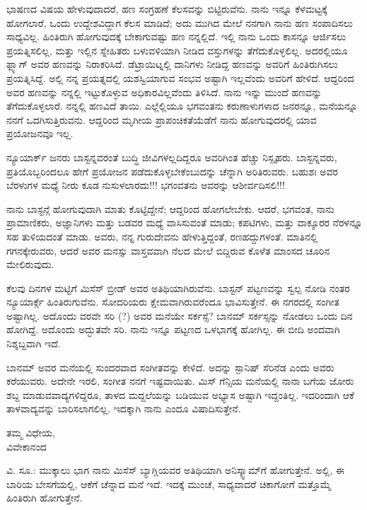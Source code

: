 ಭಾಷಣದ ವಿಷಯ ಹೇಳುವುದಾದರೆ, ಹಣ ಸಂಗ್ರಹಣೆ ಕೆಲಸವನ್ನು ಬಿಟ್ಟಿರುವೆನು. ನಾನು ಇನ್ನೂ ಕೆಳಮಟ್ಟಕ್ಕೆ ಹೋಗಲಾರೆ, ಒಂದು ಉದ್ದೇಶವಿದ್ದಾಗ ಕೆಲಸ ಮಾಡಿದೆ; ಅದು ಮುಗಿದ ಮೇಲೆ ನನಗಾಗಿ ನಾನು ಹಣ ಸಂಪಾದಿಸಲು ಸಾಧ್ಯವಿಲ್ಲ. ಹಿಂತಿರುಗಿ ಹೋಗುವುದಕ್ಕೆ ಬೇಕಾಗುವಷ್ಟು ಹಣ ನನ್ನಲ್ಲಿದೆ. ಇಲ್ಲಿ ನಾನು ಒಂದು ಕಾಸನ್ನೂ ಆರ್ಜಿಸಲು ಪ್ರಯತ್ನಿಸಲಿಲ್ಲ, ಮತ್ತು ಇಲ್ಲಿನ ಸ್ನೇಹಿತರು ಬಳುವಳಿಯಾಗಿ ನೀಡಿದ ವಸ್ತುಗಳನ್ನು ತೆಗೆದುಕೊಳ್ಳಲಿಲ್ಲ. ಅದರಲ್ಲಿಯೂ ಫ್ಲ್ಯಾಗ್ ಅವರ ಹಣವನ್ನು ನಿರಾಕರಿಸಿದೆ. ಡೆಟ್ರಾಯಿಟ್ನಲ್ಲಿ ದಾನಿಗಳು ನೀಡಿದ್ದ ಹಣವನ್ನು ಅವರಿಗೆ ಹಿಂತಿರುಗಿಸಲು ಪ್ರಯತ್ನಿಸಿದ್ದೆ. ಅಲ್ಲಿ ನನ್ನ ಪ್ರಯತ್ನದಲ್ಲಿ ಯಶಸ್ವಿಯಾಗುವ ಸಂಭವ ಅಷ್ಟಾಗಿ ಇಲ್ಲವೆಂದು ಅವರಿಗೆ ಹೇಳಿದೆ. ಆದ್ದರಿಂದ ಅವರ ಹಣವನ್ನು ನನ್ನಲ್ಲಿ ಇಟ್ಟುಕೊಳ್ಳುವ ಅಧಿಕಾರವಿಲ್ಲವೆಂದು ತಿಳಿಸಿದೆ. ನಾನು ಇನ್ನು ಮುಂದೆ ಹಣವನ್ನು ತೆಗೆದುಕೊಳ್ಳಲಾರೆ. ನನ್ನಲ್ಲಿ ಹಣವಿದೆ ತಾಯಿ. ಎಲ್ಲೆಲ್ಲಿಯೂ ಭಗವಂತನು ಕರುಣಾಳುಗಳಾದ ಜನರನ್ನೂ, ಮನೆಯನ್ನೂ ನನಗೆ ಒದಗಿಸುತ್ತಿರುವನು. ಆದ್ದರಿಂದ ಮೃಗೀಯ ಪ್ರಾಪಂಚಿಕತೆಯೆಡೆಗೆ ನಾನು ಹೋಗುವುದರಲ್ಲಿ ಯಾವ ಪ್ರಯೋಜನವೂ ಇಲ್ಲ.

ನ್ಯೂಯಾರ್ಕ್ ಜನರು ಬಾಸ್ಟನ್ನವರಂತೆ ಬುದ್ಧಿ ಜೀವಿಗಳಲ್ಲದಿದ್ದರೂ ಅವರಿಗಿಂತ ಹೆಚ್ಚು ನಿಸ್ಪೃಹರು. ಬಾಸ್ಟನ್ನವರು, ಪ್ರತಿಯೊಬ್ಬರಿಂದಲೂ ಹೇಗೆ ಪ್ರಯೋಜನ ಪಡೆದುಕೊಳ್ಳಬೇಕೆಂಬುದನ್ನು ಚೆನ್ನಾಗಿ ಅರಿತಿರುವರು. ಬಹುಶಃ ಅವರ ಬೆರಳುಗಳ ಮಧ್ಯೆ ನೀರು ಕೂಡ ನುಸುಳಲಾರದು!!! ಭಗಂವತನು ಅವರನ್ನು ಆಶೀರ್ವದಿಸಲಿ!!!

ನಾನು ಬಾಸ್ಟನ್ಗೆ ಹೋಗುವುದಾಗಿ ಮಾತು ಕೊಟ್ಟಿದ್ದೇನೆ; ಆದ್ದರಿಂದ ಹೋಗಲೇಬೇಕು. ಆದರೆ, ಭಗವಂತ, ನಾನು ಪ್ರಾಮಾಣಿಕರು, ಅಜ್ಞಾನಿಗಳು ಮತ್ತು ಬಡವರ ಮಧ್ಯೆ ವಾಸಿಸುವಂತೆ ಮಾಡು; ಕಪಟಿಗಳು, ಮತ್ತು ವಾಕ್ಶೂರರ ನೆರಳನ್ನೂ ಸಹ ತುಳಿಯದಂತೆ ಮಾಡು. ಅವರು, ನನ್ನ ಗುರುದೇವನು ಹೇಳುತ್ತಿದ್ದಂತೆ, ರಣಹದ್ದುಗಳಂತೆ. ಮಾತಿನಲ್ಲಿ ಗಗನಕ್ಕೇರುವರು, ಆದರೆ ಅವರ ಮನಸ್ಸು ವಾಸ್ತವವಾಗಿ ನೆಲದ ಮೇಲೆ ಬಿದ್ದಿರುವ ಕೊಳೆತ ಮಾಂಸದ ಚೂರಿನ ಮೇಲಿರುವುದು.

ಕೆಲವು ದಿನಗಳ ಮಟ್ಟಿಗೆ ಮಿಸೆಸ್ ಬ್ರೀಡ್ ಅವರ ಅತಿಥಿಯಾಗಿರುವೆನು. ಬಾಸ್ಟನ್ ಪಟ್ಟಣವನ್ನು ಸ್ವಲ್ಪ ನೋಡಿ ನಂತರ ನ್ಯೂಯಾರ್ಕ್ಗೆ ಹಿಂತಿರುಗುವೆನು. ಸೋದರಿಯರು ಕ್ಷೇಮವಾಗಿರುವರೆಂದೂ ಭಾವಿಸುತ್ತೇನೆ. ಈ ನಗರದಲ್ಲಿ ಸಂಗೀತ ಅಷ್ಟಾಗಿಲ್ಲ. ಅದೊಂದು ವರವೇ ಸರಿ (?) ಅವರ ಮನೆಯೇ ಸರ್ಕಸ್ಸೆ? ಬಾನಮ್​ ಸರ್ಕಸ್ಸನ್ನು ನೋಡಲು ಒಂದು ದಿನ ಹೋಗಿದ್ದೆ. ಅದೊಂದು ಅದ್ಭುತವೇ ಸರಿ. ನಾನು ಇನ್ನೂ ಪಟ್ಟಣದ ಒಳಭಾಗಕ್ಕೆ ಹೋಗಿಲ್ಲ. ಈ ಬೀದಿ ಅಂದವಾಗಿ ನಿಶ್ಶಬ್ದವಾಗಿ ಇದೆ.

ಬಾನಮ್​ ಅವರ ಮನೆಯಲ್ಲಿ ಸುಂದರವಾದ ಸಂಗೀತವನ್ನು ಕೇಳಿದೆ. ಅದನ್ನು ಸ್ಪಾನಿಷ್ ಸೆರಿನೆಡ ಎಂದು ಅವರು ಕರೆಯುವರು. ಅದೇನೇ ಇರಲಿ, ಸಂಗೀತ ನನಗೆ ಇಷ್ಟವಾಯಿತು. ಮಿಸ್ ಗೆನ್ಸಿಯ ಮನೆಯಲ್ಲಿ ನಾನಾ ಬಗೆಯ ಜೋರು ಶಬ್ದ ಮಾಡುವವಾದ್ಯಗಳಿದ್ದರೂ, ತಾಳದ ಮದ್ದಲೆಯನ್ನು ಬಡಿಯುವ ಅಭ್ಯಾಸ ಅಷ್ಟಾಗಿ ಇದ್ದಂತಿಲ್ಲ. ಇದರಿಂದಾಗಿ ಆಕೆ ತಾಳವಾದ್ಯವನ್ನು ಬಾರಿಸಲಾಗಲಿಲ್ಲ. ಇದಕ್ಕಾಗಿ ನಾನು ಎಂದೂ ವಿಷಾದಿಸುತ್ತೇನೆ.

\begin{flushright}
ತಮ್ಮ ವಿಧೇಯ,\\ವಿವೇಕಾನಂದ
\end{flushright}

ವಿ. ಸೂ.: ಮುಕ್ಕಾಲು ಭಾಗ ನಾನು ಮಿಸೆಸ್ ಬ್ಯಾಗ್ಲಿಯವರ ಅತಿಥಿಯಾಗಿ ಅನಿಸ್ಕ್ವಾಮ್​ಗೆ ಹೋಗುತ್ತೇನೆ. ಅಲ್ಲಿ, ಈ ಬಾರಿಯ ಬೇಸಗೆಯಲ್ಲಿ, ಆಕೆಗೆ ಚೆನ್ನಾದ ಮನೆ ಇದೆ. ಇದಕ್ಕೆ ಮುಂಚೆ, ಸಾಧ್ಯವಾದರೆ ಚಿಕಾಗೋಗೆ ಮತ್ತೊಮ್ಮೆ ಹಿಂತಿರುಗಿ ಹೋಗುತ್ತೇನೆ.

